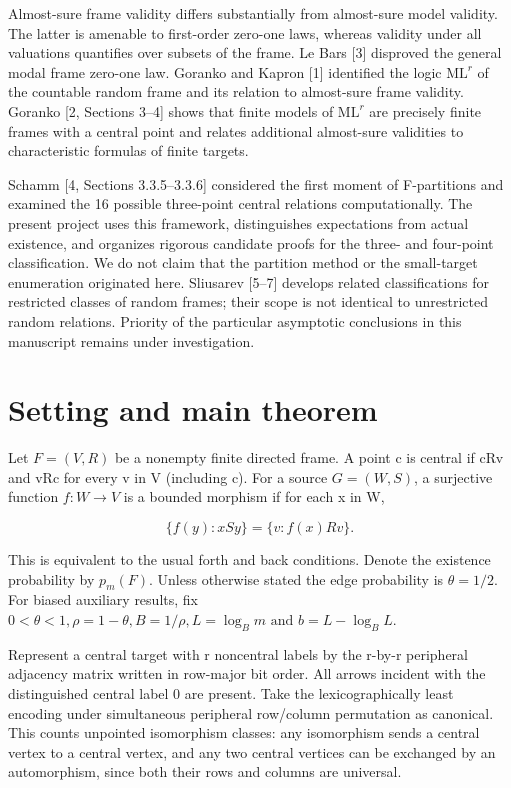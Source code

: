 \documentclass[11pt]{article}
\begin{document}
Almost-sure frame validity differs substantially from almost-sure model validity. The latter is amenable to first-order zero-one laws, whereas validity under all valuations quantifies over subsets of the frame. Le Bars [3] disproved the general modal frame zero-one law. Goranko and Kapron [1] identified the logic $\mathrm{ML}^{r}$ of the countable random frame and its relation to almost-sure frame validity. Goranko [2, Sections 3--4] shows that finite models of $\mathrm{ML}^{r}$ are precisely finite frames with a central point and relates additional almost-sure validities to characteristic formulas of finite targets.

Schamm [4, Sections 3.3.5--3.3.6] considered the first moment of F-partitions and examined the 16 possible three-point central relations computationally. The present project uses this framework, distinguishes expectations from actual existence, and organizes rigorous candidate proofs for the three- and four-point classification. We do not claim that the partition method or the small-target enumeration originated here. Sliusarev [5--7] develops related classifications for restricted classes of random frames; their scope is not identical to unrestricted random relations. Priority of the particular asymptotic conclusions in this manuscript remains under investigation.

\section{Setting and main theorem}

Let $F=(V,R)$ be a nonempty finite directed frame. A point c is central if cRv and vRc for every v in V (including c). For a source $G=(W,S)$, a surjective function $f:W\to V$ is a bounded morphism if for each x in W,

\[
\{f(y):xSy\}=\{v:f(x)Rv\}.
\]

This is equivalent to the usual forth and back conditions. Denote the existence probability by $p_{m}(F)$. Unless otherwise stated the edge probability is $\theta =1/2$. For biased auxiliary results, fix $0<\theta <1, \rho =1-\theta , B=1/\rho , L=\log _{B} m \text{ and } b=L-\log _{B} L$.

Represent a central target with r noncentral labels by the r-by-r peripheral adjacency matrix written in row-major bit order. All arrows incident with the distinguished central label 0 are present. Take the lexicographically least encoding under simultaneous peripheral row/column permutation as canonical. This counts unpointed isomorphism classes: any isomorphism sends a central vertex to a central vertex, and any two central vertices can be exchanged by an automorphism, since both their rows and columns are universal.
\end{document}

